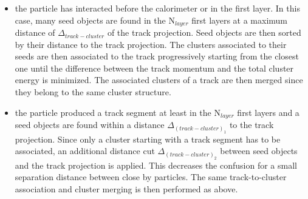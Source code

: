 \documentclass[cits]{JINST}
\begin{document}
\begin{itemize}
  \item the particle has interacted before the calorimeter or in the first layer. In this case, many seed objects are found in the N$_{layer}$ first layers at a maximum distance of $\Delta_{track-cluster}$ of the track projection. Seed objects are then sorted by their distance to the track projection. The clusters associated to their seeds are then associated to the track progressively starting from the closest one until the difference between the track momentum and the total cluster energy is minimized. The associated clusters of a track are then merged since they belong to the same cluster structure.
  \item the particle produced a track segment at least in the N$_{layer}$ first layers and a seed objects are found within a distance $\Delta_{(track-cluster)_1}$ to the track projection. Since only a cluster starting with a track segment has to be associated, an additional distance cut $\Delta_{(track-cluster)_2}$ between seed objects and the track projection is applied. This decreases the confusion for a small separation distance between close by particles. The same track-to-cluster association and cluster merging is then performed as above.
\end{itemize}
\end{document}
